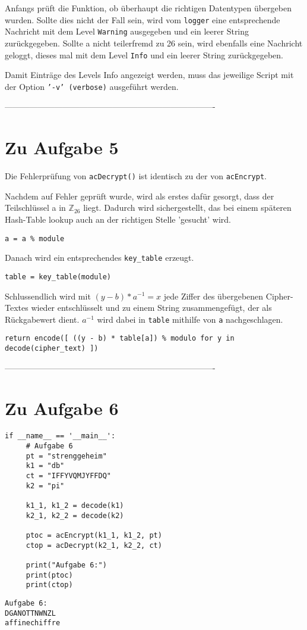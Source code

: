 \documentclass[12pt]{article}
\begin{document}
Anfangs prüft die Funktion, ob überhaupt die richtigen Datentypen übergeben wurden. Sollte dies nicht der Fall sein, wird vom \texttt{logger} eine entsprechende Nachricht mit dem Level \texttt{Warning} ausgegeben und ein leerer String zurückgegeben.
Sollte a nicht teilerfremd zu 26 sein, wird ebenfalls eine Nachricht geloggt, dieses mal mit dem Level \texttt{Info} und ein leerer String zurückgegeben.

Damit Einträge des Levels Info angezeigt werden, muss das jeweilige Script mit der Option \texttt{'-v' (verbose)} ausgeführt werden. 

%
 ----------------------------------------------------------------------------
\section{Zu Aufgabe 5}
\label{sec:aufgabe_5}
Die Fehlerprüfung von \texttt{acDecrypt()} ist identisch zu der von \texttt{acEncrypt}. 

Nachdem auf Fehler geprüft wurde, wird als erstes dafür gesorgt, dass der Teilschlüssel a in $\mathbb{Z}_{26}$ liegt. Dadurch wird sichergestellt, das bei einem späteren Hash-Table lookup auch an der richtigen Stelle 'gesucht' wird.
\begin{lstlisting}
a = a % module
\end{lstlisting}

Danach wird ein entsprechendes \texttt{key\_table} erzeugt.
\begin{lstlisting}
table = key_table(module)
\end{lstlisting}

Schlussendlich wird mit $(y - b) * a^{-1} = x$ jede Ziffer des übergebenen Cipher-Textes wieder entschlüsselt und zu einem String zusammengefügt, der als Rückgabewert dient. $a^{-1}$ wird dabei in \texttt{table} mithilfe von \texttt{a} nachgeschlagen.
\begin{lstlisting}
return encode([ ((y - b) * table[a]) % modulo for y in decode(cipher_text) ])
\end{lstlisting}

%
 ----------------------------------------------------------------------------
\section{Zu Aufgabe 6}
\begin{lstlisting}
if __name__ == '__main__':
     # Aufgabe 6 
     pt = "strenggeheim"
     k1 = "db"
     ct = "IFFYVQMJYFFDQ"
     k2 = "pi"
 
     k1_1, k1_2 = decode(k1)
     k2_1, k2_2 = decode(k2)
 
     ptoc = acEncrypt(k1_1, k1_2, pt)
     ctop = acDecrypt(k2_1, k2_2, ct)
 
     print("Aufgabe 6:")
     print(ptoc)
     print(ctop)
\end{lstlisting}
\begin{lstlisting}
Aufgabe 6:
DGANOTTNWNZL
affinechiffre
\end{lstlisting}
\end{document}
